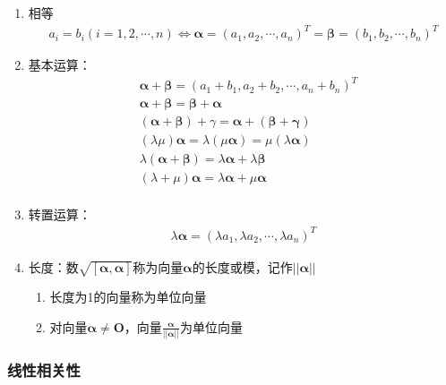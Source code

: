 \documentclass[12pt]{book}
\begin{document}
\begin{enumerate}[1.]
    \item 相等
          \begin{gather*}
              a_i=b_i(i=1,2,\cdots,n) \Leftrightarrow \bm{\alpha}=(a_1,a_2,\cdots,a_n)^{T} = \bm{\beta} = (b_1,b_2,\cdots,b_n)^T
          \end{gather*}
    \item 基本运算：
          \begin{align*}
               & \bm{\alpha}+\bm{\beta} = (a_1+b_1,a_2+b_2,\cdots,a_n+b_n)^T                 \\
               & \bm{\alpha}+\bm{\beta} =\bm{\beta}+\bm{\alpha}                              \\
               & (\bm{\alpha}+\bm{\beta})+\gamma = \bm{\alpha}+(\bm{\beta}+\bm{\gamma})      \\
               & (\lambda\mu)\bm{\alpha} = \lambda(\mu\bm{\alpha}) = \mu(\lambda\bm{\alpha}) \\
               & \lambda(\bm{\alpha}+\bm{\beta})=\lambda\bm{\alpha}+\lambda\bm{\beta}        \\
               & (\lambda+\mu)\bm{\alpha} = \lambda\bm{\alpha}+\mu\bm{\alpha}                \\
          \end{align*}
    \item 转置运算：
          \begin{gather*}
              \lambda\bm{\alpha}=(\lambda a_{1},\lambda a_2, \cdots, \lambda a_n)^T
          \end{gather*}
    \item 长度：数$\sqrt{[\bm{\alpha},\bm{\alpha}]}$称为向量$\bm{\alpha}$的长度或模，记作$||\bm{\alpha}||$
    \begin{enumerate}[(1)]
        \item 长度为1的向量称为单位向量
        \item 对向量$\bm{\alpha}\neq \bm{O}$，向量$\frac{\bm{\alpha}}{||\bm{\alpha}||}$为单位向量
    \end{enumerate}
\end{enumerate}




\subsubsection{线性相关性}
\end{document}
